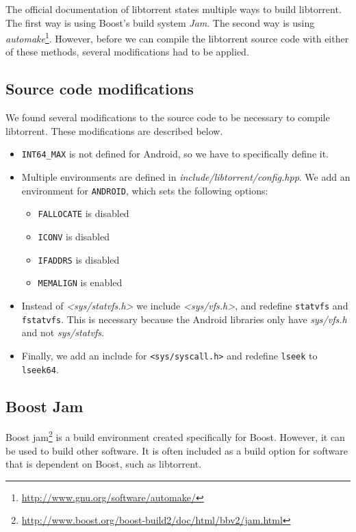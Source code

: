 		The official documentation of libtorrent states multiple ways to build libtorrent. The first way is using Boost's build system \emph{Jam}. The second way is using \emph{automake}\footnote{\url{http://www.gnu.org/software/automake/}}. However, before we can compile the libtorrent source code with either of these methods, several modifications had to be applied.
		
		\subsection{Source code modifications}
				
		We found several modifications to the source code to be necessary to compile libtorrent. These modifications are described below.
		
		\begin{itemize}
		\item \texttt{INT64\_MAX} is not defined for Android, so we have to specifically define it.
		\item Multiple environments are defined in \emph{include/libtorrent/config.hpp}. We add an environment for \texttt{ANDROID}, which sets the following options:
			\begin{itemize}
				\item \texttt{FALLOCATE} is disabled
				\item \texttt{ICONV} is disabled
				\item \texttt{IFADDRS} is disabled
				\item \texttt{MEMALIGN} is enabled
			\end{itemize}
		\item Instead of \emph{<sys/statvfs.h>} we include \emph{<sys/vfs.h>}, and redefine \texttt{statvfs} and \texttt{fstatvfs}. This is necessary because the Android libraries only have \emph{sys/vfs.h} and not \emph{sys/statvfs}.
		\item Finally, we add an include for \texttt{<sys/syscall.h>} and redefine \texttt{lseek} to \texttt{lseek64}.
		\end{itemize}
		
		\subsection{Boost Jam}
		Boost jam\footnote{\url{http://www.boost.org/boost-build2/doc/html/bbv2/jam.html}} is a build environment created specifically for Boost. However, it can be used to build other software. It is often included as a build option for software that is dependent on Boost, such as libtorrent.
		
